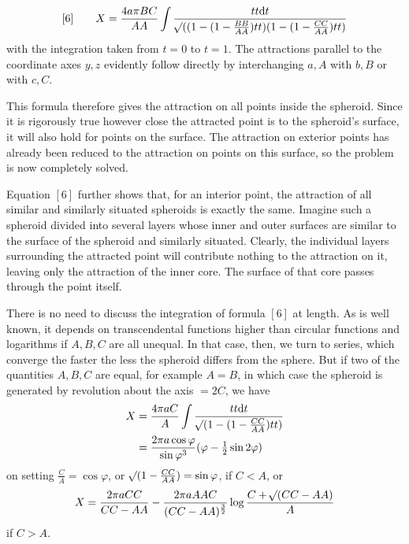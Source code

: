\[
[6]\qquad X=\frac{4a\pi BC}{AA}\int\frac{tt\mathrm{d}t}{\mathord{{}^{}\!\surd}((1-(1-\frac{BB}{AA})tt)(1-(1-\frac{CC}{AA})tt)}
\]
with the integration taken from $t=0$ to $t=1$. The attractions parallel to the coordinate axes $y,z$ evidently follow directly by interchanging $a,A$ with $b,B$ or with $c,C$.

This formula therefore gives the attraction on all points inside the spheroid. Since it is rigorously true however close the attracted point is to the spheroid’s surface, it will also hold for points on the surface. The attraction on exterior points has already been reduced to the attraction on points on this surface, so the problem is now completely solved.

Equation $[6]$ further shows that, for an interior point, the attraction of all similar and similarly situated spheroids is exactly the same. Imagine such a spheroid divided into several layers whose inner and outer surfaces are similar to the surface of the spheroid and similarly situated. Clearly, the individual layers surrounding the attracted point will contribute nothing to the attraction on it, leaving only the attraction of the inner core. The surface of that core passes through the point itself.

\par
There is no need to discuss the integration of formula $[6]$ at length. As is well known, it depends on transcendental functions higher than circular functions and logarithms if $A,B,C$ are all unequal. In that case, then, we turn to series, which converge the faster the less the spheroid differs from the sphere. But if two of the quantities $A,B,C$ are equal, for example $A=B$, in which case the spheroid is generated by revolution about the axis $=2C$, we have
\[
\begin{aligned}
X&=\frac{4\pi aC}{A}\int\frac{tt\mathrm{d}t}{\mathord{{}^{}\!\surd}(1-(1-\frac{CC}{AA})tt)}\\
&=\frac{2\pi a\cos\varphi}{\sin\varphi^3}(\varphi-\tfrac12\sin2\varphi)
\end{aligned}
\]
on setting $\frac{C}{A}=\cos\varphi$, or $\mathord{{}^{}\!\surd}(1-\frac{CC}{AA})=\sin\varphi$, if $C<A$, or
\[
X=\frac{2\pi aCC}{CC-AA}-\frac{2\pi aAAC}{(CC-AA)^{\frac32}}\log\frac{C+\mathord{{}^{}\!\surd}(CC-AA)}{A}
\]
if $C>A$.
